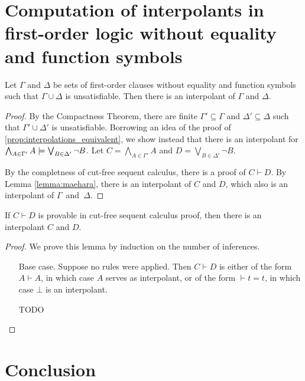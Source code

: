 \section{Computation of interpolants in first-order logic without equality and function symbols}


\begin{thm}
	\label{thm:prop_interpol}
	Let $\Gamma$ and $\Delta$ be sets of first-order clauses without equality and function symbols such that $\Gamma \cup \Delta$ is unsatisfiable. Then there is an interpolant of $\Gamma$ and $\Delta$.
\end{thm}
\begin{proof}
	By the Compactness Theorem, there are finite $\Gamma' \subseteq \Gamma$ and $\Delta' \subseteq \Delta$ such that $\Gamma' \cup \Delta'$ is unsatisfiable.
	Borrowing an idea of the proof of \ref{prop:interpolations_equivalent},
	we show instead that there is an interpolant for $\bigwedge_{A\in \Gamma'}A \models \bigvee_{B \in \Delta'} \lnot B$.
	Let $C = \bigwedge_{A \in \Gamma'} A$ and $D = \bigvee_{B \in \Delta'} \lnot B$.

	By the completness of cut-free sequent calculus, there is a proof of $C \vdash D$. By Lemma \ref{lemma:maehara}, there is an interpolant of $C$ and $D$, which also is an interpolant of $\Gamma$~and~$\Delta$.
\end{proof}

\begin{lemma}[Maehara]
	\label{lemma:maehara}
	If $C \vdash D$ is provable in cut-free sequent calculus proof,
	then there is an interpolant  $C$ and $D$.
\end{lemma}
\begin{proof}
	We prove this lemma by induction on the number of inferences.
	\begin{itemize}
		\item[Base case.] Suppose no rules were applied. Then $C \vdash D$ is either of the form $A \vdash A$, in which case $A$ serves as interpolant, or of the form $\vdash t=t$, in which case $\bot$ is an interpolant.

			TODO

	\end{itemize}
\end{proof}




\section{Conclusion}


